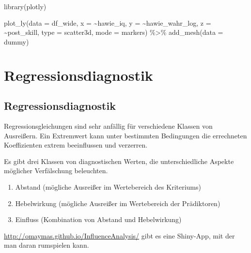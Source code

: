 \documentclass[
]{book}
\newenvironment{Shaded}{\begin{snugshade}}{\end{snugshade}}
\newcommand{\AttributeTok}[1]{\textcolor[rgb]{0.77,0.63,0.00}{#1}}
\newcommand{\FunctionTok}[1]{\textcolor[rgb]{0.00,0.00,0.00}{#1}}
\newcommand{\NormalTok}[1]{#1}
\newcommand{\SpecialCharTok}[1]{\textcolor[rgb]{0.00,0.00,0.00}{#1}}
\newcommand{\StringTok}[1]{\textcolor[rgb]{0.31,0.60,0.02}{#1}}
\begin{document}
\begin{Shaded}
\begin{Highlighting}[]
\FunctionTok{library}\NormalTok{(plotly)}

\FunctionTok{plot\_ly}\NormalTok{(}\AttributeTok{data =}\NormalTok{ df\_wide,}
        \AttributeTok{x =} \SpecialCharTok{\textasciitilde{}}\NormalTok{hawie\_iq,}
        \AttributeTok{y =} \SpecialCharTok{\textasciitilde{}}\NormalTok{hawie\_wahr\_log,}
        \AttributeTok{z =} \SpecialCharTok{\textasciitilde{}}\NormalTok{post\_skill,}
        \AttributeTok{type =} \StringTok{\textquotesingle{}scatter3d\textquotesingle{}}\NormalTok{,}
        \AttributeTok{mode =} \StringTok{\textquotesingle{}markers\textquotesingle{}}\NormalTok{) }\SpecialCharTok{\%\textgreater{}\%} 
  \FunctionTok{add\_mesh}\NormalTok{(}\AttributeTok{data =}\NormalTok{ dummy)}
\end{Highlighting}
\end{Shaded}

\hypertarget{regressionsdiagnostik}{%
\section{Regressionsdiagnostik}\label{regressionsdiagnostik}}

\hypertarget{regressionsdiagnostik-1}{%
\subsection{Regressionsdiagnostik}\label{regressionsdiagnostik-1}}

Regressionsgleichungen sind sehr anfällig für verschiedene Klassen von Ausreißern.
Ein Extremwert kann unter bestimmten Bedingungen die errechneten Koeffizienten extrem beeinflussen und verzerren.

Es gibt drei Klassen von diagnostischen Werten, die unterschiedliche Aspekte möglicher Verfälschung beleuchten.

\begin{enumerate}
\def\labelenumi{\arabic{enumi}.}
\item
  Abstand (mögliche Ausreißer im Wertebereich des Kriteriums)
\item
  Hebelwirkung (mögliche Ausreißer im Wertebereich der Prädiktoren)
\item
  Einfluss (Kombination von Abstand und Hebelwirkung)
\end{enumerate}

\href{Hier}{http://omaymas.github.io/InfluenceAnalysis/} gibt es eine Shiny-App, mit der man daran rumspielen kann.
\end{document}
